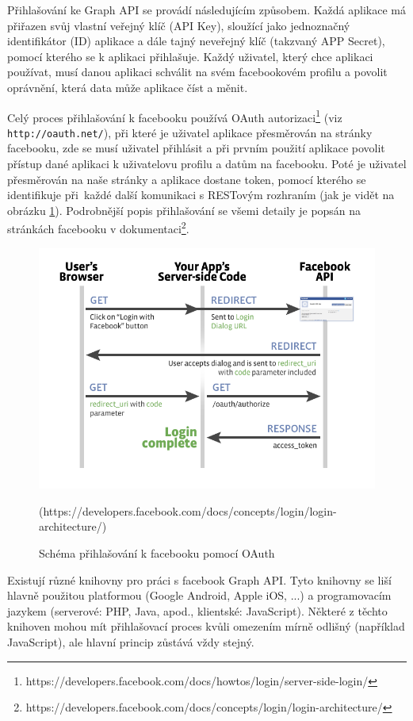 \documentclass[thesis=M,czech]{FITthesis}[2013/05/10]
\begin{document}
Přihlašování ke Graph API se provádí následujícím způsobem. Každá aplikace má přiřazen svůj vlastní veřejný klíč (API Key), sloužící jako jednoznačný identifikátor (ID) aplikace a dále tajný neveřejný klíč (takzvaný APP Secret), pomocí kterého se k aplikaci přihlašuje. Každý uživatel, který chce aplikaci používat, musí danou aplikaci schválit na svém facebookovém profilu a povolit oprávnění, která data může aplikace číst a měnit.

Celý proces přihlašování k facebooku používá OAuth autorizaci\footnote{https://developers.facebook.com/docs/howtos/login/server-side-login/} (viz \verb|http://oauth.net/|), při které je uživatel aplikace přesměrován na stránky facebooku, zde se musí uživatel přihlásit a při prvním použití aplikace povolit přístup dané aplikaci k uživatelovu profilu a datům na facebooku. Poté je uživatel přesměrován na naše stránky a aplikace dostane token, pomocí kterého se identifikuje při~každé další komunikaci s RESTovým rozhraním  (jak je vidět na obrázku \ref{fig:oAuthDiagram}). Podrobnější popis přihlašování se všemi detaily je popsán na stránkách facebooku v dokumentaci\footnote{https://developers.facebook.com/docs/concepts/login/login-architecture/}. 

\begin{figure}[h]
\begin{center}
\includegraphics[width=5in]{figures/server-side-diagram.png}
\caption{Schéma přihlašování k facebooku pomocí OAuth}
(https://developers.facebook.com/docs/concepts/login/login-architecture/)
\label{fig:oAuthDiagram}
\end{center}
\end{figure}

Existují různé knihovny pro práci s facebook Graph API. Tyto knihovny se liší hlavně použitou platformou (Google Android, Apple iOS, ...) a programovacím jazykem (serverové: PHP, Java, apod., klientské: JavaScript). Některé z těchto knihoven mohou mít přihlašovací proces kvůli omezením mírně odlišný (například JavaScript), ale hlavní princip zůstává vždy stejný.
\end{document}
